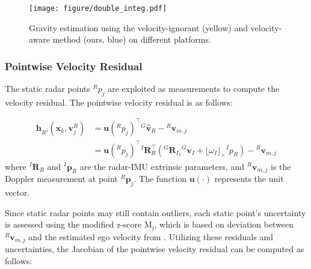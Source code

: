 \begin{figure}[!t]
    \centering
    \texttt{[image: figure/double\_integ.pdf]}
    \vspace{-6mm}
    \caption{Gravity estimation using the velocity-ignorant (yellow) and velocity-aware method (ours, blue) on different platforms.}

    \label{fig:double integration}
    \vspace{-8mm}
\end{figure}

\subsubsection{Pointwise Velocity Residual}
The static radar points ${}^Rp_j$ are exploited as measurements to compute the velocity residual. The pointwise velocity residual is as follows:

\vspace{-4mm}\small
\begin{align}
    \textbf{h}_{R^j}(\textbf{x}_k,\textbf{v}_j^R)
    &= \textbf{u}({}^Rp_j)^\top {}^G\widehat{\textbf{v}}_R-{}^R\textbf{v}_{m,j} \\
    &=\textbf{u}({}^Rp_j)^\top{}^I\textbf{R}_R^\top\left({}^G\textbf{R}_{I_k}{}^G\textbf{v}_I+\lfloor \omega_I \rfloor_{\times}{}^Ip_R\right)-{}^R\textbf{v}_{m,j} \nonumber
  \label{eq:pointwise velocity residual}
\end{align}
\normalsize
where ${}^I\textbf{R}_R$ and ${}^I\textbf{p}_R$ are the radar-\ac{IMU} extrinsic parameters, and ${}^R\textbf{v}_{m,j}$ is the Doppler measurement at point ${}^R\textbf{p}_j$. The function $\textbf{u}(\cdot)$ represents the unit vector.

Since static radar points may still contain outliers, each static point's uncertainty is assessed using the modified z-score $\mathrm{M_j}$, which is based on deviation between ${}^R\textbf{v}_{m,j}$ and the estimated ego velocity from . Utilizing these residuals and uncertainties, the Jacobian of the pointwise velocity residual can be computed as follows:

